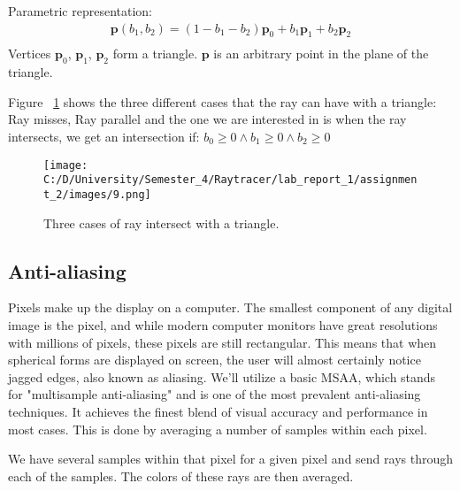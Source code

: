 \documentclass{article}
\begin{document}
	Parametric representation:
	\begin{equation}
		\begin{split}
			\pmb{p}(b_1,b_2) = (1 - b_1 - b_2)\pmb{p}_0 + b_1\pmb{p}_1 + b_2\pmb{p}_2\\
		\end{split}		
	\end{equation}
	Vertices $\pmb{p}_0$, $\pmb{p}_1$, $\pmb{p}_2$ form a triangle. $\pmb{p}$ is an arbitrary point in the plane
	of the triangle.
	
	Figure ~\ref{fig:3} shows the three different cases that the ray can have with a triangle: Ray misses, Ray parallel and the one we are interested in is when the ray intersects, we get an intersection if: 
	\( b_0 \geq
	0 \land b_1\geq
	0 \land b_2 \geq
	0 \)
	
	
	
	\begin{figure}[H]
		\begin{center}
			\texttt{[image: C:/D/University/Semester\_4/Raytracer/lab\_report\_1/assignment\_2/images/9.png]}
			
			\caption{Three cases of ray intersect with a triangle.}
			\label{fig:3}
		\end{center}
	\end{figure}
	
	\subsection{Anti-aliasing}
	Pixels make up the display on a computer. The smallest component of any digital image is the pixel, and while modern computer monitors have great resolutions with millions of pixels, these pixels are still rectangular. This means that when spherical forms are displayed on screen, the user will almost certainly notice jagged edges, also known as aliasing.
	We'll utilize a basic MSAA, which stands for "multisample anti-aliasing" and is one of the most prevalent anti-aliasing techniques. It achieves the finest blend of visual accuracy and performance in most cases. This is done by averaging a number of samples within each pixel.
	
	We have several samples within that pixel for a given pixel and send rays through each of the samples. The colors of these rays are then averaged.
	
\end{document}

